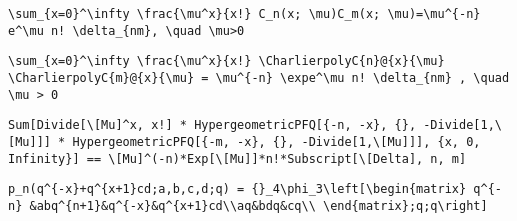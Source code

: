 \newsavebox\CIMA
\begin{lrbox}{\CIMA}
 \begin{minipage}[t]{0.82\textwidth}
  \lstinline[language={[latex]TeX},mathescape,breaklines=true]""
 \end{minipage}
\end{lrbox}
\newsavebox\CJT
\begin{lrbox}{\CJT}
 \begin{minipage}[t]{0.82\textwidth}
  \lstinline[language={[latex]TeX},mathescape,breaklines=true]"\sum_{x=0}^\infty \frac{\mu^x}{x!} C_n(x; \mu)C_m(x; \mu)=\mu^{-n} e^\mu n! \delta_{nm}, \quad \mu>0"
 \end{minipage}
\end{lrbox}
\newsavebox\CJST
\begin{lrbox}{\CJST}
 \begin{minipage}[t]{0.82\textwidth}
  \lstinline[language={[latex]TeX},mathescape,breaklines=true]"\sum_{x=0}^\infty \frac{\mu^x}{x!} \CharlierpolyC{n}@{x}{\mu} \CharlierpolyC{m}@{x}{\mu} = \mu^{-n} \expe^\mu n! \delta_{nm} , \quad \mu > 0"
 \end{minipage}
\end{lrbox}
\newsavebox\CJMM
\begin{lrbox}{\CJMM}
 \begin{minipage}[t]{0.82\textwidth}
  \lstinline[language={[latex]TeX},mathescape,breaklines=true]"Sum[Divide[\[Mu]^x, x!] * HypergeometricPFQ[{-n, -x}, {}, -Divide[1,\[Mu]]] * HypergeometricPFQ[{-m, -x}, {}, -Divide[1,\[Mu]]], {x, 0, Infinity}] == \[Mu]^(-n)*Exp[\[Mu]]*n!*Subscript[\[Delta], n, m]"
 \end{minipage}
\end{lrbox}
\newsavebox\CJMA
\begin{lrbox}{\CJMA}
 \begin{minipage}[t]{0.82\textwidth}
  \lstinline[language={[latex]TeX},mathescape,breaklines=true]""
 \end{minipage}
\end{lrbox}
\newsavebox\CKT
\begin{lrbox}{\CKT}
 \begin{minipage}[t]{0.82\textwidth}
  \lstinline[language={[latex]TeX},mathescape,breaklines=true]"p_n(q^{-x}+q^{x+1}cd;a,b,c,d;q) = {}_4\phi_3\left[\begin{matrix} q^{-n} &abq^{n+1}&q^{-x}&q^{x+1}cd\\aq&bdq&cq\\ \end{matrix};q;q\right]"
 \end{minipage}
\end{lrbox}
